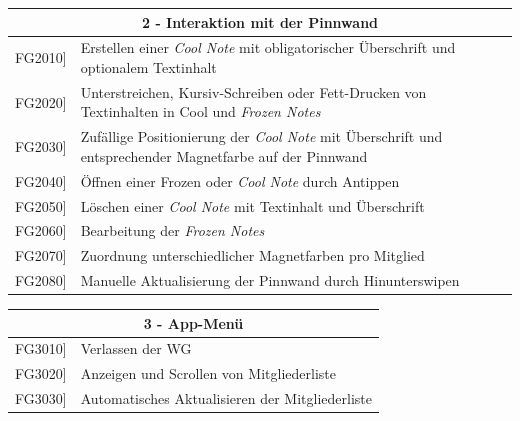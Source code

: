 \documentclass[a4paper]{scrreprt}
\begin{document}
    		\begin{table}[h!]
    			\centering
    			\label{my-label}
    			\begin{tabular}{p{2cm}p{12cm}}
    				
    				\multicolumn{2}{c}{\textbf{2 - Interaktion mit der Pinnwand}} \\ \hline
    				\centering{[}FG2010{]} & Erstellen einer \textit{Cool Note} mit obligatorischer Überschrift und optionalem Textinhalt\\
    				\centering{[}FG2020{]}& Unterstreichen, Kursiv-Schreiben oder Fett-Drucken von Textinhalten in Cool und \textit{Frozen Notes}                               \\
    				\centering{[}FG2030{]}& Zufällige Positionierung der \textit{Cool Note} mit Überschrift und entsprechender Magnetfarbe auf der Pinnwand\\ 
    				\centering{[}FG2040{]}& Öffnen einer Frozen oder \textit{Cool Note} durch Antippen\\ 
    				\centering{[}FG2050{]}& Löschen einer \textit{Cool Note} mit Textinhalt und Überschrift\\ 
    				\centering{[}FG2060{]}& Bearbeitung der \textit{Frozen Notes}\\ 
    				\centering{[}FG2070{]}& Zuordnung unterschiedlicher Magnetfarben pro Mitglied\\ 
    				\centering{[}FG2080{]}& Manuelle Aktualisierung der Pinnwand durch Hinunterswipen\\ 
    				\hline
    			\end{tabular}
    		\end{table}
    		
    		\vspace{5mm}
    		
    		\begin{table}[h!]
    			\centering
    			\label{my-label}
    			\begin{tabular}{p{2cm}p{12cm}}
    				
    				\multicolumn{2}{c}{\textbf{3 - App-Menü}} \\ \hline
    				\centering{[}FG3010{]} & Verlassen der WG\\
    				\centering{[}FG3020{]} & Anzeigen und Scrollen von Mitgliederliste \\
    				\centering{[}FG3030{]} & Automatisches Aktualisieren der Mitgliederliste\\
    				\hline
    			\end{tabular}
    		\end{table}
    		
\end{document}
